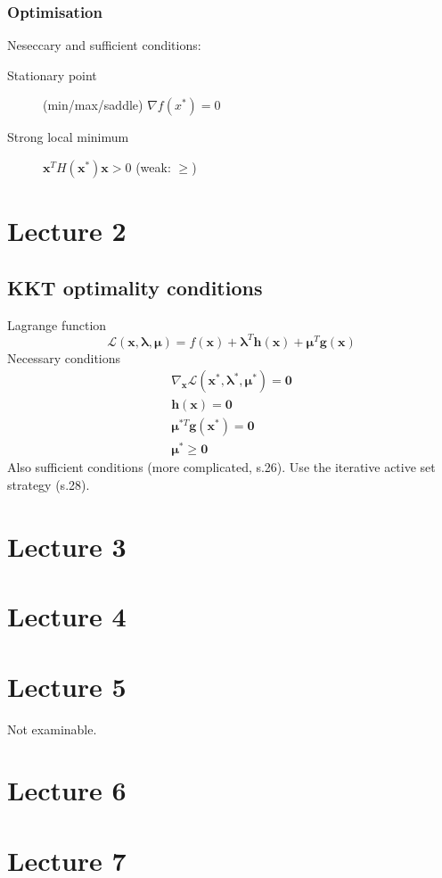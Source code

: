 \documentclass[a4paper,twocolumn,10pt]{article}
\begin{document}
\subsubsection{Optimisation}
Neseccary and sufficient conditions:
\begin{description}
    \item[Stationary point] (min/max/saddle) $\nabla f\left(x^{*}\right)=0$
    \item[Strong local minimum] $\boldsymbol{x}^{T} H\left(\boldsymbol{x}^{*}\right) \boldsymbol{x}>0$ (weak: $\geq$) 
\end{description}

\section{Lecture 2}
\subsection{KKT optimality conditions}
Lagrange function
\begin{equation}
    \mathcal{L}\left(\boldsymbol{x}, \boldsymbol{\lambda}, \boldsymbol{\mu}\right)= f\left(\boldsymbol{x}\right)+\boldsymbol{\lambda}^{T} \boldsymbol{h}\left(\boldsymbol{x}\right)+\boldsymbol{\mu}^{T} \boldsymbol{g}\left(\boldsymbol{x}\right)
\end{equation}
Necessary conditions
\begin{align}
    \nabla_{\boldsymbol{x}} \mathcal{L}\left(\boldsymbol{x}^{*}, \boldsymbol{\lambda}^{*}, \boldsymbol{\mu}^{*}\right)=\mathbf{0} \\
    \boldsymbol{h}(\boldsymbol{x})=\mathbf{0} \\
    \boldsymbol{\mu}^{* T} \boldsymbol{g}\left(\boldsymbol{x}^{*}\right)=\mathbf{0} \\
    \boldsymbol{\mu}^{*} \geq \mathbf{0}
\end{align}
Also sufficient conditions (more complicated, s.26).
Use the iterative active set strategy (s.28).

\section{Lecture 3}

\section{Lecture 4}

\section{Lecture 5}

Not examinable.

\section{Lecture 6}

\section{Lecture 7}
\end{document}
